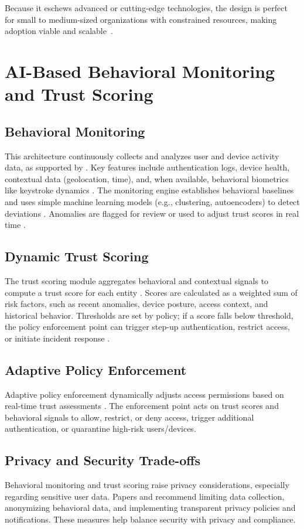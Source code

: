 \documentclass[conference]{IEEEtran}
\begin{document}
Because it eschews advanced or cutting-edge technologies, the design is perfect for small to medium-sized organizations with constrained resources, making adoption viable and scalable~\cite{paper6,paper10,paper12}.

\section{AI-Based Behavioral Monitoring and Trust Scoring}

\subsection{Behavioral Monitoring}
This architecture continuously collects and analyzes user and device activity data, as supported by \cite{paper2,paper6,paper8}. Key features include authentication logs, device health, contextual data (geolocation, time), and, when available, behavioral biometrics like keystroke dynamics \cite{paper2}. The monitoring engine establishes behavioral baselines and uses simple machine learning models (e.g., clustering, autoencoders) to detect deviations \cite{paper6}. Anomalies are flagged for review or used to adjust trust scores in real time \cite{paper2,paper8}.

\subsection{Dynamic Trust Scoring}
The trust scoring module aggregates behavioral and contextual signals to compute a trust score for each entity \cite{paper2,paper8,paper10}. Scores are calculated as a weighted sum of risk factors, such as recent anomalies, device posture, access context, and historical behavior. Thresholds are set by policy; if a score falls below threshold, the policy enforcement point can trigger step-up authentication, restrict access, or initiate incident response \cite{paper2,paper12}.

\subsection{Adaptive Policy Enforcement}
Adaptive policy enforcement dynamically adjusts access permissions based on real-time trust assessments \cite{paper2,paper8,paper12,paper13}. The enforcement point acts on trust scores and behavioral signals to allow, restrict, or deny access, trigger additional authentication, or quarantine high-risk users/devices.

\subsection{Privacy and Security Trade-offs}
Behavioral monitoring and trust scoring raise privacy considerations, especially regarding sensitive user data. Papers \cite{paper2} and \cite{paper8} recommend limiting data collection, anonymizing behavioral data, and implementing transparent privacy policies and notifications. These measures help balance security with privacy and compliance.
\end{document}
